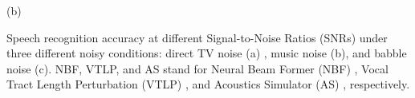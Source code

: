 \documentclass[a0,portrait]{a0poster}
\newenvironment{Figure}
  {\par\medskip\noindent\minipage{\linewidth}}
  {\endminipage\par\medskip}
\begin{document}
\begin{multicols}{2}
\begin{Figure}
\begin{minipage}{0.49\textwidth}
		{(b)}
    \end{minipage}
%
%
  {\label{fig:plot_farfield_wer}
  Speech recognition accuracy at different Signal-to-Noise Ratios (SNRs)
  under three different noisy conditions: direct TV noise (a)
  , music noise (b), and babble noise (c). NBF, VTLP, and AS
  stand for Neural Beam Former (NBF) \cite{j_heymann_icassp_2016_00},
  Vocal Tract Length Perturbation (VTLP) \cite{c_kim_interspeech_2019_00} , and
  Acoustics Simulator (AS) \cite{c_kim_interspeech_2017_00},
  respectively.
  \vspace{-2mm}
 }
\end{Figure}


%
\color{SaddleBrown} %
%
\color{DarkSlateGray} %
\small


\end{multicols}
\end{document}
